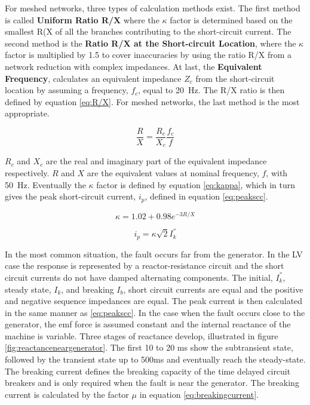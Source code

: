 For meshed networks, three types of calculation methods exist. The first method is called \textbf{Uniform Ratio R/X} where the $\kappa$ factor is determined based on the smallest R(X of all the branches contributing to the short-circuit current. The second method is the \textbf{Ratio R/X at the Short-circuit Location}, where the $\kappa$ factor is multiplied by 1.5 to cover inaccuracies by using the ratio R/X from a network reduction with complex impedances. At last, the \textbf{Equivalent Frequency}, calculates an equivalent impedance $Z_c$ from the short-circuit location by assuming a frequency, $f_c$, equal to 20~Hz. The R/X ratio is then defined by equation \ref{eq:R/X}. For meshed networks, the last method is the most appropriate.  

\begin{equation}
    \frac{R}{X} = \frac{R_c}{X_c} \frac{f_c}{f}
    \label{eq:R/X}
\end{equation}

$R_c$ and $X_c$ are the real and imaginary part of the equivalent impedance respectively. $R$ and $X$ are the equivalent values at nominal frequency, $f$, with 50~Hz. Eventually the $\kappa$ factor is defined by equation \ref{eq:kappa}, which in turn gives the peak short-circuit current, $i_p$, defined in equation \ref{eq:peakscc}.

\begin{equation}
    \kappa = 1.02 + 0.98e^{-3R/X}
    \label{eq:kappa}
\end{equation}

\begin{equation}
    i_p = \kappa\sqrt{2}I_k^{''}
    \label{eq:peakscc}
\end{equation}

In the most common situation, the fault occurs far from the generator. In the LV case the response is represented by a reactor-resistance circuit and the short circuit currents do not have damped alternating components. The initial, $I_k^{''}$, steady state, $I_k$, and breaking $I_b$, short circuit currents are equal and the positive and negative sequence impedances are equal. The peak current is then calculated in the same manner as \ref{eq:peakscc}. In the case when the fault occurs close to the generator, the emf force is assumed constant and the internal reactance of the machine is variable. Three stages of reactance develop, illustrated in figure \ref{fig:reactanceneargenerator}. The first 10 to 20 ms show the subtransient state, followed by the transient state up to 500ms and eventually reach the steady-state. The breaking current defines the breaking capacity of the time delayed circuit breakers and is only required when the fault is near the generator. The breaking current is calculated by the factor $\mu$ in equation \ref{eq:breakingcurrent}.

